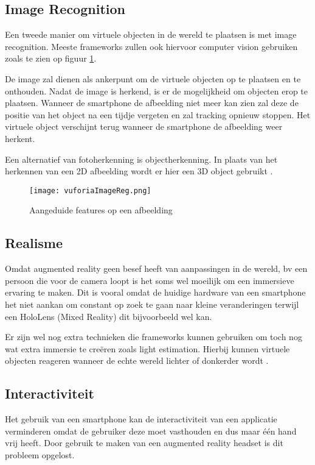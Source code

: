 \subsection{Image Recognition}
Een tweede manier om virtuele objecten in de wereld te plaatsen is met image recognition. Meeste frameworks zullen ook hiervoor computer vision gebruiken zoals te zien op figuur \ref{fig:imagereg}.

De image zal dienen als ankerpunt om de virtuele objecten op te plaatsen en te onthouden. 
Nadat de image is herkend, is er de mogelijkheid om objecten erop te plaatsen. Wanneer de smartphone de afbeelding niet meer kan zien zal deze de positie van het object na een tijdje vergeten en zal tracking opnieuw stoppen. Het virtuele object verschijnt terug wanneer de smartphone de afbeelding weer herkent.

Een alternatief van fotoherkenning is objectherkenning. In plaats van het herkennen van een 2D afbeelding wordt er hier een 3D object gebruikt \autocite{VuforiaObject}.

\begin{figure}
    \texttt{[image: vuforiaImageReg.png]}
    \caption{Aangeduide features op een afbeelding \autocite{VuforiaImageTracking}}
    \label{fig:imagereg}
\end{figure}

\subsection{Realisme}
Omdat augmented reality geen besef heeft van aanpassingen in de wereld, bv een persoon die voor de camera loopt is het soms wel moeilijk om een immersieve ervaring te maken. Dit is vooral omdat de huidige hardware van een smartphone het niet aankan om constant op zoek te gaan naar kleine veranderingen terwijl een HoloLens (Mixed Reality) dit bijvoorbeeld wel kan.

Er zijn wel nog extra technieken die frameworks kunnen gebruiken om toch nog wat extra immersie te creëren zoals light estimation. Hierbij kunnen virtuele objecten reageren wanneer de echte wereld lichter of donkerder wordt \autocite{ARCoreConcepts}.

\subsection{Interactiviteit}
Het gebruik van een smartphone kan de interactiviteit van een applicatie verminderen omdat de gebruiker deze moet vasthouden en dus maar één hand vrij heeft. Door gebruik te maken van een augmented reality headset is dit probleem opgelost.

